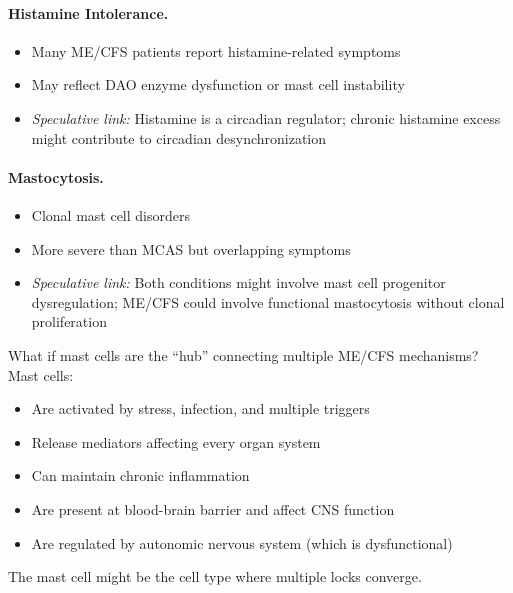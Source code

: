 \paragraph{Histamine Intolerance.}
\begin{itemize}
    \item Many ME/CFS patients report histamine-related symptoms
    \item May reflect DAO enzyme dysfunction or mast cell instability
    \item \textit{Speculative link:} Histamine is a circadian regulator; chronic histamine excess might contribute to circadian desynchronization
\end{itemize}

\paragraph{Mastocytosis.}
\begin{itemize}
    \item Clonal mast cell disorders
    \item More severe than MCAS but overlapping symptoms
    \item \textit{Speculative link:} Both conditions might involve mast cell progenitor dysregulation; ME/CFS could involve functional mastocytosis without clonal proliferation
\end{itemize}

\begin{open_question}
What if mast cells are the ``hub'' connecting multiple ME/CFS mechanisms? Mast cells:
\begin{itemize}
    \item Are activated by stress, infection, and multiple triggers
    \item Release mediators affecting every organ system
    \item Can maintain chronic inflammation
    \item Are present at blood-brain barrier and affect CNS function
    \item Are regulated by autonomic nervous system (which is dysfunctional)
\end{itemize}
The mast cell might be the cell type where multiple locks converge.
\end{open_question}

